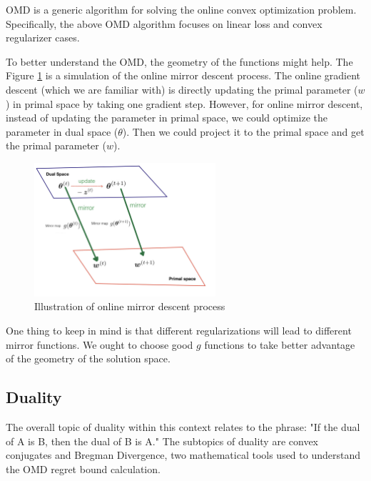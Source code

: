 \documentclass[11pt]{article}
\begin{document}
OMD is a generic algorithm for solving the online convex optimization problem. Specifically, the above OMD algorithm focuses on linear loss and convex regularizer cases.

To better understand the OMD, the geometry of the functions might help. The Figure \ref{fig:dual_primal} is a simulation of the online mirror descent process. The online gradient descent (which we are familiar with) is directly updating the primal parameter ($w$) in primal space by taking one gradient step. However, for online mirror descent, instead of updating the parameter in primal space, we could optimize the parameter in dual space ($\theta$). Then we could project it to the primal space and get the primal parameter ($w$). 

\begin{figure}[H]
    \centering
    \includegraphics[width=0.6\textwidth]{geometry.jpg}
    \caption{Illustration of online mirror descent process}
    \label{fig:dual_primal}
\end{figure}

One thing to keep in mind is that different regularizations will lead to different mirror functions. We ought to choose good $g$ functions to take better advantage of the geometry of the solution space.


\subsection{Duality}
The overall topic of duality within this context relates to the phrase: "If the dual of A is B, then the dual of B is A." The subtopics of duality are convex conjugates and Bregman Divergence, two mathematical tools used to understand the OMD regret bound calculation.
\end{document}
